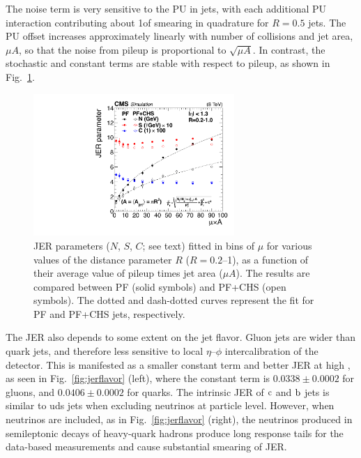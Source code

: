 \documentclass[11pt,twoside,a4paper,cmspaper,final,collab]{cms-tdr}
\begin{document}
The noise term is very sensitive to the PU in jets, with each additional PU interaction contributing about 1\GeV of smearing in quadrature for $R=0.5$ jets. The PU offset increases approximately linearly with
number of collisions and jet area,
$\mu A$, so that the noise from pileup is proportional to $\sqrt{\mu A}$. In contrast, the stochastic and constant terms are stable with respect to pileup, as shown in Fig.~\ref{fig:jercone}.

\begin{figure}[htbp!]
\centering
\includegraphics[width=0.68\textwidth]{Figure_037.pdf}
\caption{\label{fig:jercone}
JER parameters ($N$, $S$, $C$; see text) fitted in bins of $\mu$ for various values of the distance parameter $R$ ($R=0.2$--1), as a function of their average value of pileup times jet area ($\mu  A$). The results are compared between PF (solid symbols) and PF+CHS (open symbols).
The dotted and dash-dotted curves represent the fit for PF and PF+CHS jets, respectively.
}
\end{figure}

The JER also depends to some extent on the jet flavor. Gluon jets are wider than quark jets, and therefore less sensitive to local $\eta$--$\phi$ intercalibration of the detector. This is manifested as a smaller constant term and better JER at high \pt, as seen in Fig.~\ref{fig:jerflavor} (left), where the constant term is $0.0338\pm 0.0002$ for gluons, and $0.0406\pm 0.0002$ for quarks. The intrinsic JER of $\mathrm{c}$ and $\mathrm{b}$ jets is similar to uds jets when excluding neutrinos at particle level. However, when neutrinos are included, as in Fig.~\ref{fig:jerflavor} (right), the neutrinos produced in semileptonic decays of heavy-quark hadrons produce long response tails for the data-based measurements and cause substantial smearing of JER.
\end{document}
